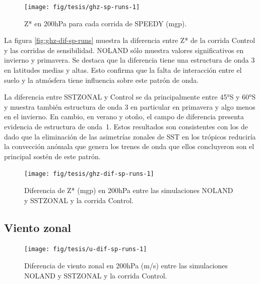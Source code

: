 \documentclass[spanish,a4paper,12pt,oneside]{book}
\begin{document}
\begin{landscape}\begin{figure}

{\centering \texttt{[image: fig/tesis/ghz-sp-runs-1]} 

}

\caption{Z* en 200hPa para cada corrida de SPEEDY (mgp).}\label{fig:ghz-sp-runs}
\end{figure}
\end{landscape}

La figura \autoref{fig:ghz-dif-sp-runs} muestra la diferencia entre Z*
de la corrida Control y las corridas de sensibilidad. NOLAND sólo
muestra valores significativos en invierno y primavera. Se destaca que
la diferencia tiene una estructura de onda 3 en latitudes medias y
altas. Esto confirma que la falta de interacción entre el suelo y la
atmósfera tiene influencia sobre este patrón de onda.

La diferencia entre SSTZONAL y Control se da principalmente entre 45°S y
60°S y muestra también estructura de onda 3 en particular en primavera y
algo menos en el invierno. En cambio, en verano y otoño, el campo de
diferencia presenta evidencia de estructura de onda~1. Estos resultados
son consistentes con los de \citet{Quintanar1995} dado que la
eliminación de las asimetrías zonales de SST en los trópicos reduciría
la convección anómala que genera los trenes de onda que ellos
concluyeron son el principal sostén de este patrón.

\begin{landscape}\begin{figure}

{\centering \texttt{[image: fig/tesis/ghz-dif-sp-runs-1]} 

}

\caption{Diferencia de Z* (mgp) en 200hPa entre las simulaciones NOLAND y SSTZONAL y la corrida Control.}\label{fig:ghz-dif-sp-runs}
\end{figure}
\end{landscape}

\subsection{Viento zonal}\label{viento-zonal-2}

\begin{landscape}\begin{figure}

{\centering \texttt{[image: fig/tesis/u-dif-sp-runs-1]} 

}

\caption{Diferencia de viento zonal en 200hPa (m/s) entre las simulaciones NOLAND y SSTZONAL y la corrida Control.}\label{fig:u-dif-sp-runs}
\end{figure}
\end{landscape}
\end{document}
